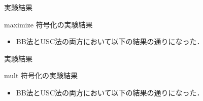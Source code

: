 \documentclass[dvipdfmx,11pt]{beamer}
\begin{document}

\begin{frame}{実験結果}
 \begin{block}{maximize}
  符号化の実験結果
  \begin{itemize}
   \item BB法とUSC法の両方において以下の結果の通りになった．
         \centering
         {\tiny }
  \end{itemize}
 \end{block}
\end{frame}


\begin{frame}{実験結果}
 \begin{block}{mult}
  符号化の実験結果
  \begin{itemize}
   \item BB法とUSC法の両方において以下の結果の通りになった．
         \centering
         {\tiny }
  \end{itemize}
 \end{block}
\end{frame}

\end{document}
